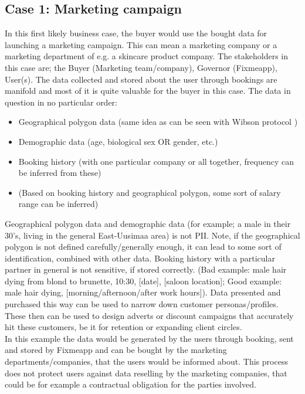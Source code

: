 \documentclass[a4paper,11pt]{report} %
\theoremstyle{change}
\theoremstyle{theoremstyle}
\begin{document}
\subsection{Case 1: Marketing campaign}
In this first likely business case, the buyer would use the bought data for launching a marketing campaign. This can mean a marketing company or a marketing department of e.g. a skincare product company. The stakeholders in this case are; the Buyer (Marketing team/company), Governor (Fixmeapp), User(s). The data collected and stored about the user through bookings are manifold and most of it is quite valuable for the buyer in this case. The data in question in no particular order:
\begin{itemize}
    \item Geographical polygon data (same idea as can be seen with Wibson protocol \cite{futoransky2020wibsontree})
    \item Demographic data (age, biological sex OR gender, etc.)
    \item Booking history (with one particular company or all together, frequency can be inferred from these)
    \item (Based on booking history and geographical polygon, some sort of salary range can be inferred) %
\end{itemize}
Geographical polygon data and demographic data (for example; a male in their 30's, living in the general East-Uusimaa area) is not PII. Note, if the geographical polygon is not defined carefully/generally enough, it can lead to some sort of identification, combined with other data. Booking history with a particular partner in general is not sensitive, if stored correctly. (Bad example: male hair dying from blond to brunette, 10:30, [date], [saloon location]; Good example: male hair dying, [morning/afternoon/after work hours]). Data presented and purchased this way can be used to narrow down customer personas/profiles. These then can be used to design adverts or discount campaigns that accurately hit these customers, be it for retention or expanding client circles.\\
In this example the data would be generated by the users through booking, sent and stored by Fixmeapp and can be bought by the marketing departments/companies, that the users would be informed about. This process does not protect users against data reselling by the marketing companies, that could be for example a contractual obligation for the parties involved.\\
\end{document}
